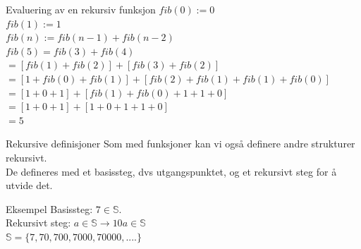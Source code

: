 \begin{frame}{Evaluering av en rekursiv funksjon}
    $fib(0) := 0$\\
    $fib(1) := 1$\\
    $fib(n) := fib(n-1) + fib(n-2)$\\
    
    \pause
    $fib(5) = fib(3) + fib(4)$\\
    $ = [fib(1) + fib(2)] + [fib(3) + fib(2)]$\\
    $ = [1 + fib(0) + fib(1)] + [fib(2) + fib(1) + fib(1) + fib(0)]$\\
    $ = [1 + 0 + 1] + [fib(1) + fib(0) + 1 + 1 + 0]$\\
    $ = [1 + 0 + 1] + [1 + 0 + 1 + 1 + 0]$\\
    $ = 5$
\end{frame}

\begin{frame}{Rekursive definisjoner}
    Som med funksjoner kan vi også definere andre strukturer rekursivt.\\
    
    De defineres med et basissteg, dvs utgangspunktet, og et rekursivt steg for å utvide det.\\
    
    \pause
    \begin{block}{Eksempel}
        Basissteg: $7 \in \mathbb{S}$.\\
        Rekursivt steg: $a \in \mathbb{S} \rightarrow 10a \in \mathbb{S}$\\
        $\mathbb{S} = \{7, 70, 700, 7000, 70000, ....\}$
    \end{block}
\end{frame}

